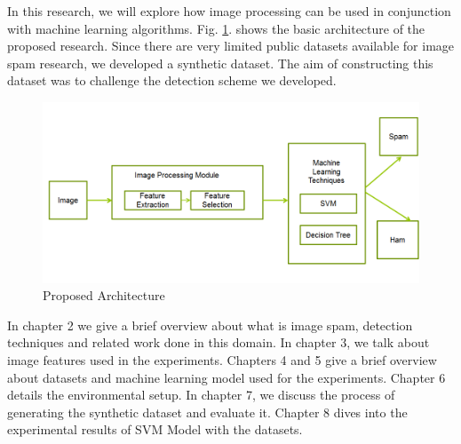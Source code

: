 \par In this research, we will explore how image processing can be used in conjunction with machine learning algorithms. Fig. \ref{fig:architecture}. shows the basic architecture of the proposed research. Since there are very limited public datasets available for image spam research, we developed a synthetic dataset. The aim of constructing this dataset was to challenge the detection scheme we developed. 

\begin{figure}
	\centering
	\includegraphics[width=\textwidth]{images/architecture}
	\caption{Proposed Architecture}
	\label{fig:architecture}
\end{figure}

\par In chapter 2 we give a brief overview about what is image spam, detection techniques and related work done in this domain. In chapter 3, we talk about image features used in the experiments. Chapters 4 and 5 give a brief overview about datasets and machine learning model used for the experiments. Chapter 6 details the environmental setup. In chapter 7, we discuss the process of generating the synthetic dataset and evaluate it. Chapter 8 dives into the experimental results of SVM Model with the datasets.
